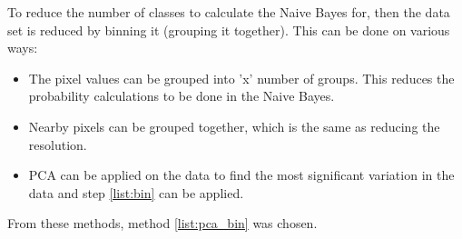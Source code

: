 To reduce the number of classes to calculate the Naive Bayes for, then the data set is reduced by binning it (grouping it together).
This can be done on various ways:

\begin{itemize}
\item The pixel values can be grouped into 'x' number of groups.
This reduces the probability calculations to be done in the Naive Bayes. \label{list:bin}
\item Nearby pixels can be grouped together, which is the same as reducing the resolution.
\item PCA can be applied on the data to find the most significant variation in the data and step \ref{list:bin} can be applied. \label{list:pca_bin}
\end{itemize}

From these methods, method \ref{list:pca_bin} was chosen.